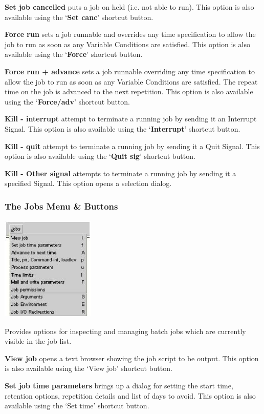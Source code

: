 \textbf{Set job cancelled} puts a job on held (i.e. not able to run). This option is also available using the `\textbf{Set canc}' shortcut button.

\textbf{Force run} sets a job runnable and overrides any time specification to allow the job to run as soon as any Variable
Conditions are satisfied. This option is also available using the `\textbf{Force}' shortcut button.

\textbf{Force run + advance} sets a job runnable overriding any time specification to allow the job to run as soon as any Variable
Conditions are satisfied. The repeat time on the job is advanced to the next repetition. This option is also available using the
`\textbf{Force/adv}' shortcut button.

\textbf{Kill - interrupt} attempt to terminate a running job by sending it an Interrupt Signal. This option is also available using the
`\textbf{Interrupt}' shortcut button.

\textbf{Kill - quit} attempt to terminate a running job by sending it a Quit Signal. This option is also available using the
`\textbf{Quit sig}' shortcut button.

\textbf{Kill - Other signal} attempts to terminate a running job by sending it a specified Signal. This option opens a selection dialog.

\subsubsection{The Jobs Menu \& Buttons}
 \includegraphics[width=4.479cm,height=4.971cm]{img/ref17.jpg} 

Provides options for inspecting and managing batch jobs which are currently visible in the job list.

\textbf{View job} opens a text browser showing the job script to be output. This option is also available using the `View job' shortcut button.

\textbf{Set job time parameters} brings up a dialog for setting the start time, retention options, repetition details and list of days to
avoid. This option is also available using the `Set time' shortcut button.

